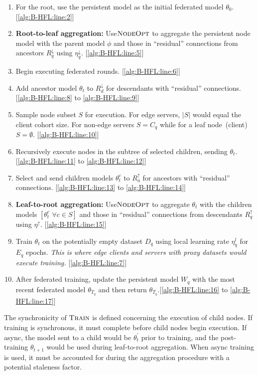 \begin{singlespace*}
    \begin{enumerate}
        \item For the root, use the persistent model as the initial federated model $\theta_0$.  [\cref{alg:B-HFL:line:2}]

        \item \textbf{Root-to-leaf aggregation:} Use$\textsc{NodeOpt}$ to aggregate the persistent node model with the parent model $\phi$ and those in ``residual'' connections from ancestors $R^\downarrow_q$ using $\eta^\downarrow_q$. [\cref{alg:B-HFL:line:5}]
        \item Begin executing federated rounds. [\cref{alg:B-HFL:line:6}]

        \item Add ancestor model $\theta_t$ to $R^\downarrow_d$ for descendants with ``residual'' connections. [\cref{alg:B-HFL:line:8} to \ref{alg:B-HFL:line:9}]
        \item Sample node subset $S$ for execution. For edge servers, $\lvert S \rvert$ would equal the client cohort size. For non-edge servers $S = C_q$ while for a leaf node~(client) $S = \emptyset$. [\cref{alg:B-HFL:line:10}]
        \item Recursively execute nodes in the subtree of selected children, sending $\theta_t$.  [\cref{alg:B-HFL:line:11} to \ref{alg:B-HFL:line:12}]
        \item Select and send children models $\theta_t^c$ to $R^\uparrow_a$ for ancestors with ``residual'' connections. [\cref{alg:B-HFL:line:13} to \ref{alg:B-HFL:line:14}]
        \item \textbf{Leaf-to-root aggregation:} Use$\textsc{NodeOpt}$ to aggregate $\theta_t$ with the children models $[\theta^c_t \,\, \forall c \in S]$ and those in ``residual'' connections from descendants $R^\uparrow_q$ using $\eta^\uparrow$.  [\cref{alg:B-HFL:line:15}]
        \item Train $\theta_t$ on the potentially empty dataset $D_q$ using local learning rate $\eta^l_q$ for $E_q$ epochs. \textit{This is where edge clients and servers with proxy datasets would execute training.} [\cref{alg:B-HFL:line:7}]
        \item After federated training, update the persistent model $W_q$ with the most recent federated model $\theta_{T_q}$ and then return $\theta_{T_q}$.[\cref{alg:B-HFL:line:16} to \ref{alg:B-HFL:line:17}]
    \end{enumerate}
\end{singlespace*}
The synchronicity of $\textsc{Train}$ is defined concerning the execution of child nodes. If training is synchronous, it must complete before child nodes begin execution. If async, the model sent to a child would be $\theta_{t}^\prime$ prior to training, and the post-training $\theta_{t+1}$ would be used during leaf-to-root aggregation. When async training is used, it must be accounted for during the aggregation procedure with a potential staleness factor.

